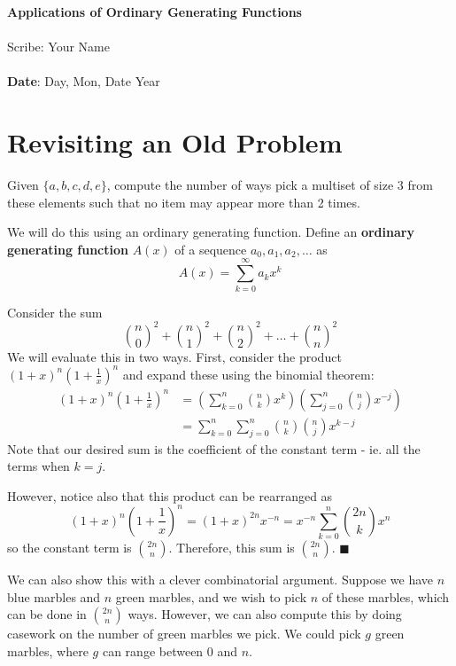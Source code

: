 \documentclass[11pt,twosided]{article}
\def\titlestring{Applications of Ordinary Generating Functions}
\def\scribestring{Your Name}
\def\datestring{Day, Mon, Date Year}
\begin{document}
\thispagestyle{plain}  %

\noindent
{\LARGE \textbf{\titlestring}}\\\\
%
{\Large Scribe: \scribestring}\\ \\
{\textbf{Date}: \datestring}


\noindent

\section{Revisiting an Old Problem}
\begin{problem}{1}
	Given $\{ a, b, c, d, e \}$, compute the number of ways pick a multiset of size $3$ from these elements such that no item may appear more than 2 times. 
\end{problem}

We will do this using an ordinary generating function. Define an \textbf{ordinary generating function} $A(x)$ of a sequence $a_0, a_1, a_2, \ldots$ as 
\[
	A(x) = \sum_{k=0}^\infty a_k x^k 
\]

Consider the sum 
\[
	\binom{n}{0}^2 + \binom{n}{1}^2 + \binom{n}{2}^2 + \ldots + \binom{n}{n}^2
\]
We will evaluate this in two ways. First, consider the product $(1+x)^n \left( 1 + \frac{1}{x} \right)^n$ and expand these using the binomial theorem: 
\begin{align*}
(1+x)^n \left( 1 + \frac{1}{x} \right)^n &= \left( \sum_{k=0}^n \binom{n}{k} x^k \right) \left( \sum_{j=0}^n \binom{n}{j} x^{-j} \right) \\
&= \sum_{k=0}^n \sum_{j=0}^n \binom{n}{k} \binom{n}{j} x^{k-j} 
\end{align*}
Note that our desired sum is the coefficient of the constant term - ie. all the terms when $k=j$. 

However, notice also that this product can be rearranged as 
\[
	(1+x)^n \left( 1 + \frac{1}{x} \right)^n = (1+x)^{2n} x^{-n} = x^{-n} \sum_{k=0}^n \binom{2n}{k} x^n 
\]
so the constant term is $\binom{2n}{n}$. Therefore, this sum is $\binom{2n}{n}$. $\blacksquare$

We can also show this with a clever combinatorial argument. Suppose we have $n$ blue marbles and $n$ green marbles, and we wish to pick $n$ of these marbles, which can be done in $\binom{2n}{n}$ ways. However, we can also compute this by doing casework on the number of green marbles we pick. We could pick $g$ green marbles, where $g$ can range between $0$ and $n$. 
\end{document}
